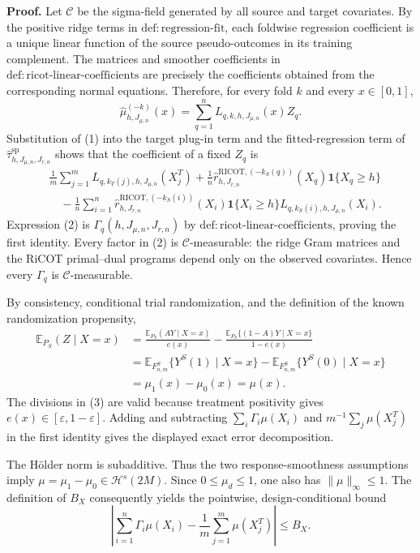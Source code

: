 \textbf{Proof.}
Let \(\mathcal C\) be the sigma-field generated by all source and target covariates. By the positive ridge terms in \(\mathrm{def:regression\text{-}fit}\), each foldwise regression coefficient is a unique linear function of the source pseudo-outcomes in its training complement. The matrices and smoother coefficients in \(\mathrm{def:ricot\text{-}linear\text{-}coefficients}\) are precisely the coefficients obtained from the corresponding normal equations. Therefore, for every fold \(k\) and every \(x\in[0,1]\),
\[
\widehat\mu^{(-k)}_{h,J_{\mu,n}}(x)
=\sum_{q=1}^n L_{q,k,h,J_{\mu,n}}(x)Z_q.
\tag{1}
\]
Substitution of (1) into the target plug-in term and the fitted-regression term of \(\widehat\tau^{\mathrm{sp}}_{h,J_{\mu,n},J_{r,n}}\) shows that the coefficient of a fixed \(Z_q\) is
\[
\begin{aligned}
{}&\frac1m\sum_{j=1}^mL_{q,k_T(j),h,J_{\mu,n}}(X_j^T)
+\frac1n\widehat r^{\mathrm{RICOT},(-k_S(q))}_{h,J_{r,n}}(X_q)\mathbf 1\{X_q\ge h\}\\
&\quad-\frac1n\sum_{i=1}^n
\widehat r^{\mathrm{RICOT},(-k_S(i))}_{h,J_{r,n}}(X_i)\mathbf 1\{X_i\ge h\}
L_{q,k_S(i),h,J_{\mu,n}}(X_i).
\end{aligned}
\tag{2}
\]
Expression (2) is \(\Gamma_q(h,J_{\mu,n},J_{r,n})\) by \(\mathrm{def:ricot\text{-}linear\text{-}coefficients}\), proving the first identity. Every factor in (2) is \(\mathcal C\)-measurable: the ridge Gram matrices and the RiCOT primal--dual programs depend only on the observed covariates. Hence every \(\Gamma_q\) is \(\mathcal C\)-measurable.

By consistency, conditional trial randomization, and the definition of the known randomization propensity,
\[
\begin{aligned}
\mathbb E_{P_S}(Z\mid X=x)
&=\frac{\mathbb E_{P_S}(AY\mid X=x)}{e(x)}
-\frac{\mathbb E_{P_S}\{(1-A)Y\mid X=x\}}{1-e(x)}\\
&=\mathbb E_{F^S_{n,m}}\{Y^S(1)\mid X=x\}
-\mathbb E_{F^S_{n,m}}\{Y^S(0)\mid X=x\}\\
&=\mu_1(x)-\mu_0(x)=\mu(x).
\end{aligned}
\tag{3}
\]
The divisions in (3) are valid because treatment positivity gives \(e(x)\in[\varepsilon,1-\varepsilon]\). Adding and subtracting \(\sum_i\Gamma_i\mu(X_i)\) and \(m^{-1}\sum_j\mu(X_j^T)\) in the first identity gives the displayed exact error decomposition.

The H\"older norm is subadditive. Thus the two response-smoothness assumptions imply \(\mu=\mu_1-\mu_0\in\mathcal H^s(2M)\). Since \(0\le\mu_d\le1\), one also has \(\|\mu\|_\infty\le1\). The definition of \(B_X\) consequently yields the pointwise, design-conditional bound
\[
\left|\sum_{i=1}^n\Gamma_i\mu(X_i)-\frac1m\sum_{j=1}^m\mu(X_j^T)\right|\le B_X.
\tag{4}
\]

